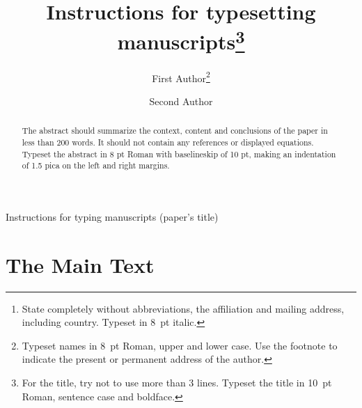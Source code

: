 \documentclass{ws-ijmpc}
\begin{document}
{Instructions for typing manuscripts (paper's title)}

\catchline{}{}{}{}{}

\title{Instructions for typesetting
manuscripts\footnote{For the title, try not to use more than
3 lines. Typeset the title in 10~pt Roman, sentence case and
boldface.}
}

\author{First Author\footnote{
Typeset names in 8~pt Roman, upper and lower case. Use the footnote to indicate the
present or permanent address of the author.}}

\address{University Department, University Name, Address\\
City, State ZIP/Zone,
Country\footnote{State completely without abbreviations, the
affiliation and mailing address, including country. Typeset in 8~pt
italic.}\\
first\_author@domain\_name}

\author{Second Author}

\address{Group, Laboratory, Address\\
City, State ZIP/Zone, Country\\
second\_author@domain\_name}

\maketitle

\begin{history}
\end{history}

\begin{abstract}
The abstract should summarize the context, content
and conclusions of the paper in less than 200 words. It should
not contain any references or displayed equations. Typeset the
abstract in 8 pt Roman with baselineskip of 10 pt, making
an indentation of 1.5 pica on the left and right margins.

\end{abstract}


\section{The Main Text}
\end{document}

